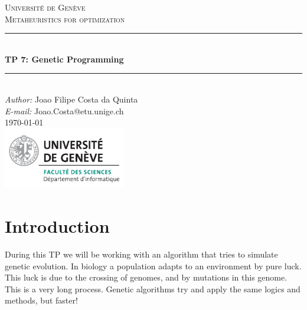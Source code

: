 \documentclass[a4paper]{article}
\makeatletter
\newcommand\TPid{7}
\newcommand\TPname{Genetic Programming}
\newcommand\Firstname{Joao Filipe}
\newcommand\Familyname{Costa da Quinta}
\newcommand\Email{Joao.Costa@etu.unige.ch}
\makeatother
\begin{document}
\begin{titlepage}

\newcommand{\HRule}{\rule{\linewidth}{0.5mm}} 							%

\center 
 
\textsc{\LARGE Université de Genève}\\[1cm]

\textsc{\Large Metaheuristics for optimization}\\[0.2cm]									%
\HRule \\[0.8cm]
{ \huge \bfseries TP \TPid : \TPname}\\[0.7cm]								%
\HRule \\[2cm]
\large
\emph{Author:} \Firstname \; \Familyname\\[0.5cm]		
\emph{E-mail:} {\color{blue}\Email}\\[7cm]		
{\large \today}\\[2cm]
\includegraphics[width=0.4\textwidth]{images/unige_csd.png}\\[1cm] 	%
\vfill 
\end{titlepage}


\newpage
\section{Introduction}
During this TP we will be working with an algorithm that tries to simulate genetic evolution. In biology a population adapts to an environment by pure luck. This luck is due to the crossing of genomes, and by mutations in this genome. This is a very long process. Genetic algorithms try and apply the same logics and methods, but faster!
\end{document}

